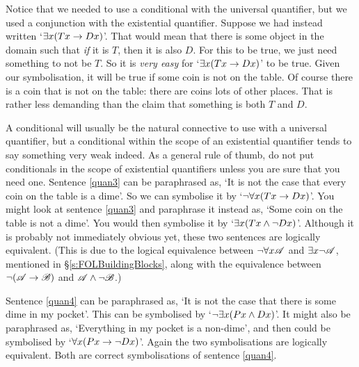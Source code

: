Notice that we needed to use a conditional with the universal quantifier, but we used a conjunction with the existential quantifier. Suppose we had instead written `$\exists x(Tx \rightarrow Dx)$'. That would mean that there is some object in the domain such that  \emph{if} it is $T$, then it is also $D$. For this to be true, we just need something to not be $T$. So it is \emph{very easy} for `$\exists x(Tx \rightarrow Dx)$' to be true. Given our symbolisation, it will be true if some coin is not on the table. Of course there is a coin that is not on the table: there are coins lots of other places.  That is rather less demanding than the claim that something is both $T$ and $D$.


A conditional will usually be the natural connective to use with a universal quantifier, but a conditional within the scope of an existential quantifier tends to say something very weak indeed. As a general rule of thumb, do not put conditionals in the scope of existential quantifiers unless you are sure that you need one.
Sentence \ref{quan3} can be paraphrased as, `It is not the case that every coin on the table is a dime'. So we can symbolise it by `$\neg \forall x(Tx \rightarrow Dx)$'. You might look at sentence \ref{quan3} and paraphrase it instead as, `Some coin on the table is not a dime'. You would then symbolise it by `$\exists x(Tx \wedge \neg Dx)$'. Although it is probably not immediately obvious yet, these two sentences are logically equivalent. (This is due to the logical equivalence between $\neg\forall x\mathscr{A}$ and $\exists x\neg\mathscr{A}$, mentioned in §\ref{s:FOLBuildingBlocks}, along with the equivalence between $\neg(\mathscr{A}\rightarrow\mathscr{B})$ and $\mathscr{A}\wedge\neg\mathscr{B}$.)

Sentence \ref{quan4} can be paraphrased as, `It is not the case that there is some dime in my pocket'. This can be symbolised by `$\neg\exists x(Px \wedge Dx)$'. It might also be paraphrased as, `Everything in my pocket is a non-dime', and then could be symbolised by `$\forall x(Px \rightarrow \neg Dx)$'. Again the two symbolisations are logically equivalent. Both are correct symbolisations of sentence \ref{quan4}.


